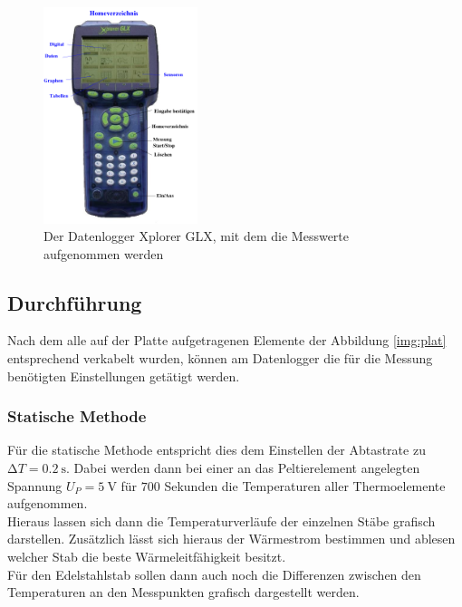 \begin{figure}[ht]
    \centering
    \includegraphics[width=0.4\textwidth]{latex/images/geraet.PNG}
    \caption{Der Datenlogger Xplorer GLX, mit dem die Messwerte aufgenommen werden  \protect \cite{V204}}
  \label{img:log}
\end{figure}

\subsection{Durchführung}

\noindent Nach dem alle auf der Platte aufgetragenen Elemente der Abbildung \ref{img:plat} entsprechend verkabelt wurden, 
können am Datenlogger die für die Messung benötigten Einstellungen getätigt werden.

\subsubsection{Statische Methode}
\noindent
Für die statische Methode entspricht dies dem Einstellen der Abtastrate zu $\increment T= \SI{0.2}{\second}$.
Dabei werden dann bei einer an das Peltierelement angelegten Spannung $U_P=\SI{5}{\volt}$ für $700$ Sekunden die Temperaturen aller Thermoelemente aufgenommen.\\
Hieraus lassen sich dann die Temperaturverläufe der einzelnen Stäbe grafisch darstellen. Zusätzlich lässt sich hieraus der Wärmestrom bestimmen und ablesen welcher Stab die beste Wärmeleitfähigkeit besitzt.\\
Für den Edelstahlstab sollen dann auch noch die Differenzen zwischen den Temperaturen an den Messpunkten grafisch dargestellt werden.


